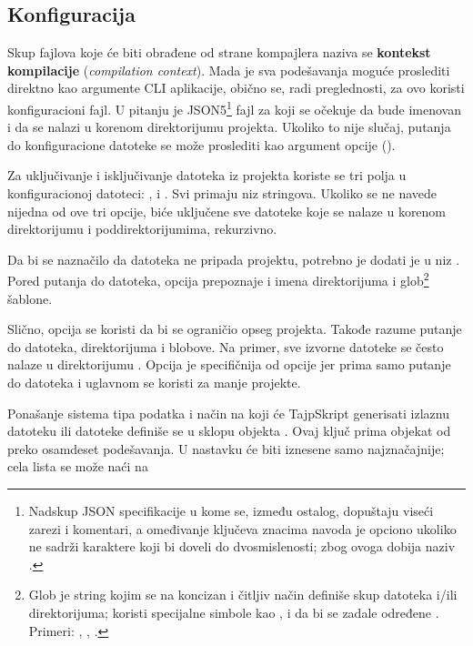\subsection{Konfiguracija}

Skup fajlova koje će biti obrađene od strane kompajlera naziva se \textbf{kontekst kompilacije} (\textsl{compilation context}).
Mada je sva podešavanja moguće proslediti direktno kao argumente CLI aplikacije, obično se, radi preglednosti, za ovo koristi konfiguracioni fajl.
U pitanju je JSON5\footnote{Nadskup JSON specifikacije u kome se, između ostalog, dopuštaju viseći zarezi i komentari, a omeđivanje ključeva znacima navoda je opciono ukoliko ne sadrži karaktere koji bi doveli do dvosmislenosti; zbog ovoga dobija naziv .} fajl za koji se očekuje da bude imenovan  i da se nalazi u korenom direktorijumu projekta.
Ukoliko to nije slučaj, putanja do konfiguracione datoteke se može proslediti kao argument opcije  ().

Za uključivanje i isključivanje datoteka iz projekta koriste se tri polja u konfiguracionoj datoteci: ,  i .
Svi primaju niz stringova.
Ukoliko se ne navede nijedna od ove tri opcije, biće uključene sve  datoteke koje se nalaze u korenom direktorijumu i poddirektorijumima, rekurzivno.

Da bi se naznačilo da datoteka ne pripada projektu, potrebno je dodati je u niz .
Pored putanja do datoteka,  opcija prepoznaje i imena direktorijuma i glob\footnote{Glob je string kojim se na koncizan i čitljiv način definiše skup datoteka i/ili direktorijuma; koristi specijalne simbole kao \code{*}, \code{**} i  da bi se zadale određene . Primeri: , , .} šablone.

Slično,  opcija se koristi da bi se ograničio opseg projekta.
Takođe razume putanje do datoteka, direktorijuma i blobove.
Na primer, sve izvorne datoteke se često nalaze u direktorijumu .
Opcija  je specifičnija od opcije  jer prima samo putanje do datoteka i uglavnom se koristi za manje projekte.

Ponašanje sistema tipa podatka i način na koji će TajpSkript generisati izlaznu datoteku ili datoteke definiše se u sklopu objekta .
Ovaj ključ prima objekat od preko osamdeset podešavanja.
U nastavku će biti iznesene samo najznačajnije; cela lista se može naći na %

